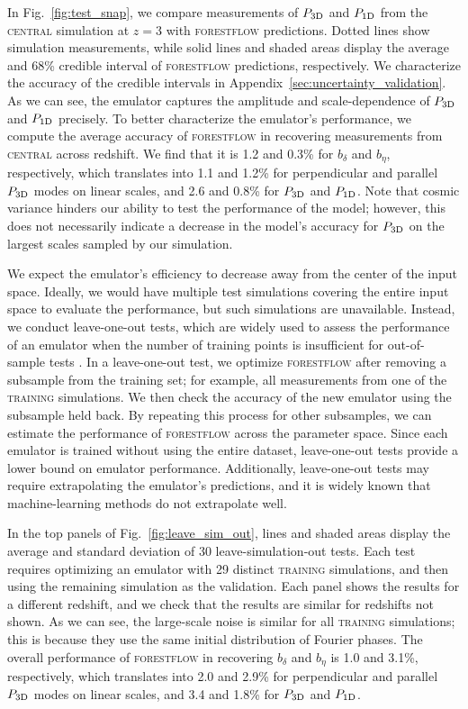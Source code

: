 \documentclass[longauth]{aa}
\newcommand{\poned}{\ensuremath{P_{\rm 1D}}\xspace}
\newcommand{\pthreed}{\ensuremath{P_{\rm 3D}}\xspace}
\newcommand{\forestflow}{\textsc{forestflow}\xspace}
\newcommand{\lacehc}{\textsc{training}\xspace}
\newcommand{\simcentral}{\textsc{central}\xspace}
\begin{document}
In Fig.~\ref{fig:test_snap}, we compare measurements of \pthreed and \poned from the \simcentral simulation at $z=3$ with \forestflow predictions. Dotted lines show simulation measurements, while solid lines and shaded areas display the average and 68\% credible interval of \forestflow predictions, respectively. We characterize the accuracy of the credible intervals in Appendix~\ref{sec:uncertainty_validation}. As we can see, the emulator captures the amplitude and scale-dependence of \pthreed and \poned precisely. To better characterize the emulator's performance, we compute the average accuracy of \forestflow in recovering measurements from \simcentral across redshift. We find that it is 1.2 and 0.3\% for $b_\delta$ and $b_\eta$, respectively, which translates into 1.1 and 1.2\% for perpendicular and parallel \pthreed modes on linear scales, and 2.6 and 0.8\% for \pthreed and \poned. Note that cosmic variance hinders our ability to test the performance of the model; however, this does not necessarily indicate a decrease in the model's accuracy for \pthreed on the largest scales sampled by our simulation.

We expect the emulator's efficiency to decrease away from the center of the input space. Ideally, we would have multiple test simulations covering the entire input space to evaluate the performance, but such simulations are unavailable. Instead, we conduct leave-one-out tests, which are widely used to assess the performance of an emulator when the number of training points is insufficient for out-of-sample tests \citep[e.g.;][]{hastie01statisticallearning}. In a leave-one-out test, we optimize \forestflow after removing a subsample from the training set; for example, all measurements from one of the \lacehc simulations. We then check the accuracy of the new emulator using the subsample held back. By repeating this process for other subsamples, we can estimate the performance of \forestflow across the parameter space. Since each emulator is trained without using the entire dataset, leave-one-out tests provide a lower bound on emulator performance. Additionally, leave-one-out tests may require extrapolating the emulator's predictions, and it is widely known that machine-learning methods do not extrapolate well.

In the top panels of Fig.~\ref{fig:leave_sim_out}, lines and shaded areas display the average and standard deviation of 30 leave-simulation-out tests. Each test requires optimizing an emulator with 29 distinct \lacehc simulations, and then using the remaining simulation as the validation. Each panel shows the results for a different redshift, and we check that the results are similar for redshifts not shown. As we can see, the large-scale noise is similar for all \lacehc simulations; this is because they use the same initial distribution of Fourier phases. The overall performance of \forestflow in recovering $b_\delta$ and $b_\eta$ is 1.0 and 3.1\%, respectively, which translates into 2.0 and 2.9\% for perpendicular and parallel \pthreed modes on linear scales, and 3.4 and 1.8\% for \pthreed and \poned.
\end{document}
